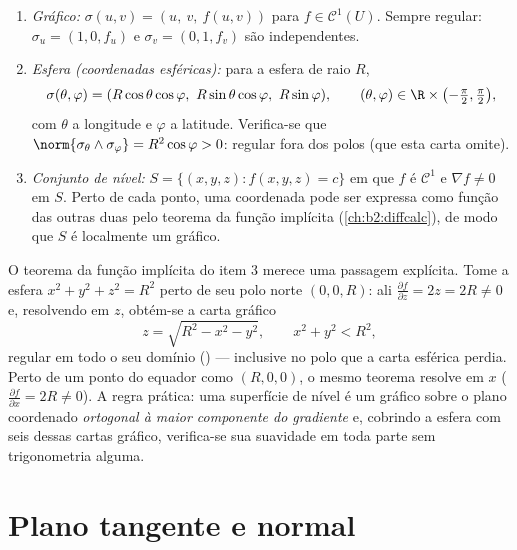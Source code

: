 \begin{example}\label{ex:b2:surfaces:standard}
\leavevmode
\begin{enumerate}
\item \emph{Gráfico:} $\sigma(u, v) = (u,\ v,\ f(u, v))$ para $f \in
\mathcal{C}^1(U)$. Sempre regular: $\sigma_u = (1, 0, f_u)$ e
$\sigma_v = (0, 1, f_v)$ são independentes.
\item \emph{Esfera (coordenadas esféricas):} para a esfera de
raio $R$,
\[
\sigma(\theta, \varphi)
= (R\cos\theta\cos\varphi,\ R\sin\theta\cos\varphi,\
R\sin\varphi),
\qquad
(\theta, \varphi) \in \R \times
\bigl(-\tfrac\pi2, \tfrac\pi2\bigr),
\]
com $\theta$ a longitude e $\varphi$ a latitude. Verifica-se que
$\norm{\sigma_\theta \wedge \sigma_\varphi} = R^2\cos\varphi > 0$:
regular fora dos polos (que esta carta omite).
\item \emph{Conjunto de nível:} $S = \{(x,y,z) : f(x, y, z) = c\}$ em que
$f$ é $\mathcal{C}^1$ e $\nabla f \neq 0$ em $S$. Perto de cada
ponto, uma coordenada pode ser expressa como função das outras
duas pelo teorema da função implícita (\cref{ch:b2:diffcalc}), de modo que
$S$ é localmente um gráfico.
\end{enumerate}
\end{example}

\begin{example}
\label{ex:b2:surfaces:levelgraph}
O teorema da função implícita do item 3 merece uma passagem
explícita. Tome a esfera $x^2 + y^2 + z^2 = R^2$ perto de seu polo
norte $(0, 0, R)$: ali $\frac{\partial f}{\partial z} = 2z =
2R \neq 0$ e, resolvendo em $z$, obtém-se a carta gráfico
\[
z = \sqrt{R^2 - x^2 - y^2},
\qquad x^2 + y^2 < R^2 ,
\]
regular em todo o seu domínio () --- inclusive no
polo que a carta esférica perdia. Perto de um ponto do equador
como $(R, 0, 0)$, o mesmo teorema resolve em $x$
($\frac{\partial f}{\partial x} = 2R \neq 0$). A regra
prática: uma superfície de nível é um gráfico sobre o plano coordenado
\emph{ortogonal à maior componente do gradiente} e,
cobrindo a esfera com seis dessas cartas gráfico,
verifica-se sua suavidade em toda parte sem trigonometria
alguma.
\end{example}

\section{Plano tangente e normal}

